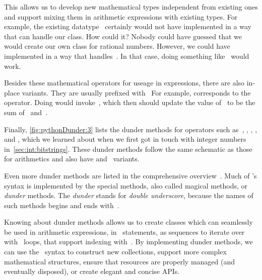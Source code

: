 This allows us to develop new mathematical types independent from existing ones and support mixing them in arithmetic expressions with existing types.
For example, the existing datatype~ certainly would not have  implemented in a way that can handle our  class.
How could it?
Nobody could have guessed that we would create our own class for rational numbers.
However, we could have implemented  in a way that handles~.
In that case, doing something like~ would work.

Besides these mathematical operators for useage in expressions, there are also in-place variants.
They are usually prefixed with~
For example,  corresponds to the~\pythonil{+=} operator.
Doing  would invoke~, which then should update the value of~ to be the sum of~ and~.

Finally, \cref{fig:pythonDunder:3} lists the dunder methods for operators such as~\pythonilIdx{\&}, \pythonil{|}\pythonIdx{\textbar}, \pythonil{\^}\pythonIdx{\textasciicircum}, \pythonil{>>}\pythonIdx{>\strut>}, and \pythonil{<<}\pythonIdx{<\strut<}, which we learned about when we first got in touch with integer numbers in~\cref{sec:int:bitstrings}.
These dunder methods follow the same schematic as those for arithmetics and also have  and ~variants.

Even more dunder methods are listed in the comprehensive overview~\cite{H2024EDMIP}.
%
\endhsection%
%
%
Much of \python's syntax is implemented by the special methods, also called magical methods, or \emph{dunder} methods.
The \emph{dunder} stands for \emph{double underscore}, because the names of such methods begins and ends with~\pythonilIdx{\_\_}.

Knowing about dunder methods allows us to create classes which can seamlessly be used in arithmetic expressions, in ~statements, as sequences to iterate over with ~loops, that support indexing with~\pythonil{[...]}\pythonIdx{[\idxdots]}.
By implementing dunder methods, we can use the \python\ syntax to construct new collections, support more complex mathematical structures, ensure that resources are properly managed (and eventually disposed), or create elegant and concise APIs.%
\endhsection%
%
\FloatBarrier%
\endhsection%
